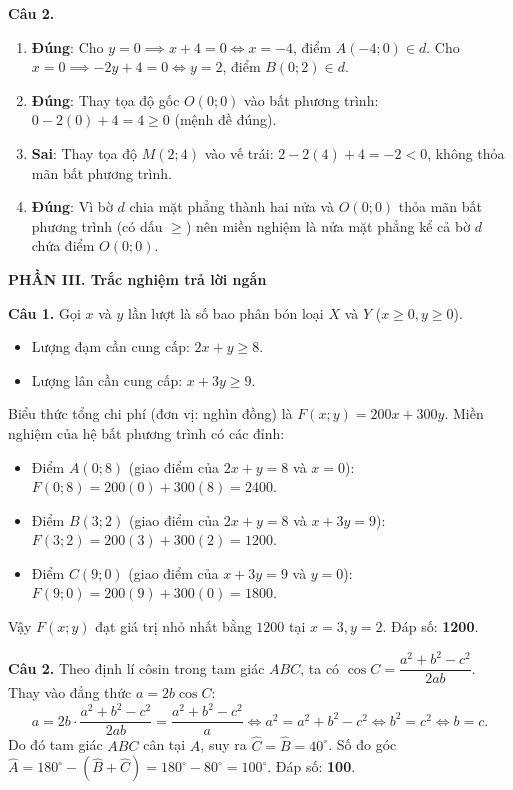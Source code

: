 \documentclass[12pt,a4paper]{article}
\begin{document}
\textbf{Câu 2.}
\begin{enumerate}[itemsep=1.5pt, topsep=1.5pt]
    \item \textbf{Đúng}: Cho $y = 0 \implies x + 4 = 0 \iff x = -4$, điểm $A(-4; 0) \in d$. Cho $x = 0 \implies -2y + 4 = 0 \iff y = 2$, điểm $B(0; 2) \in d$.
    \item \textbf{Đúng}: Thay tọa độ gốc $O(0; 0)$ vào bất phương trình: $0 - 2(0) + 4 = 4 \ge 0$ (mệnh đề đúng).
    \item \textbf{Sai}: Thay tọa độ $M(2; 4)$ vào vế trái: $2 - 2(4) + 4 = -2 < 0$, không thỏa mãn bất phương trình.
    \item \textbf{Đúng}: Vì bờ $d$ chia mặt phẳng thành hai nửa và $O(0; 0)$ thỏa mãn bất phương trình (có dấu $\ge$) nên miền nghiệm là nửa mặt phẳng kể cả bờ $d$ chứa điểm $O(0; 0)$.
\end{enumerate}

\vspace{0.15cm}
\textbf{\large PHẦN III. Trắc nghiệm trả lời ngắn}

\textbf{Câu 1.}
Gọi $x$ và $y$ lần lượt là số bao phân bón loại $X$ và $Y$ ($x \ge 0, y \ge 0$).
\begin{itemize}[leftmargin=0.5cm, itemsep=1pt, topsep=1pt]
    \item Lượng đạm cần cung cấp: $2x + y \ge 8$.
    \item Lượng lân cần cung cấp: $x + 3y \ge 9$.
\end{itemize}
Biểu thức tổng chi phí (đơn vị: nghìn đồng) là $F(x; y) = 200x + 300y$.
Miền nghiệm của hệ bất phương trình có các đỉnh:
\begin{itemize}[leftmargin=0.5cm, itemsep=1pt, topsep=1pt]
    \item Điểm $A(0; 8)$ (giao điểm của $2x + y = 8$ và $x = 0$): $F(0; 8) = 200(0) + 300(8) = 2400$.
    \item Điểm $B(3; 2)$ (giao điểm của $2x + y = 8$ và $x + 3y = 9$): $F(3; 2) = 200(3) + 300(2) = 1200$.
    \item Điểm $C(9; 0)$ (giao điểm của $x + 3y = 9$ và $y = 0$): $F(9; 0) = 200(9) + 300(0) = 1800$.
\end{itemize}
Vậy $F(x; y)$ đạt giá trị nhỏ nhất bằng $1200$ tại $x = 3, y = 2$. Đáp số: \textbf{1200}.

\textbf{Câu 2.}
Theo định lí côsin trong tam giác $ABC$, ta có $\cos C = \dfrac{a^2 + b^2 - c^2}{2ab}$. Thay vào đẳng thức $a = 2b\cos C$:
\[
a = 2b \cdot \dfrac{a^2 + b^2 - c^2}{2ab} = \dfrac{a^2 + b^2 - c^2}{a} \iff a^2 = a^2 + b^2 - c^2 \iff b^2 = c^2 \iff b = c.
\]
Do đó tam giác $ABC$ cân tại $A$, suy ra $\widehat{C} = \widehat{B} = 40^\circ$. Số đo góc $\widehat{A} = 180^\circ - (\widehat{B} + \widehat{C}) = 180^\circ - 80^\circ = 100^\circ$.
Đáp số: \textbf{100}.
\end{document}
